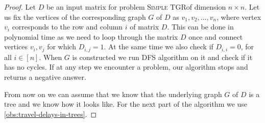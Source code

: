 \documentclass[11pt,a4paper]{article}
\theoremstyle{remark}
\theoremstyle{definition}
\newcommand{\deltaExact}{\textsc{Simple TGR}}
\begin{document}
\begin{proof}
    Let $D$ be an input matrix for problem \deltaExact of dimension $n \times n$.
    Let us fix the vertices of the corresponding graph $G$ of $D$ as $v_1, v_2, \dots, v_n$, where vertex $v_i$ corresponds to the row and column $i$ of matrix $D$.
    This can be done in polynomial time as we need to loop through the matrix $D$ once and connect vertices $v_i, v_j$ for which $D_{i,j} = 1$. At the same time we also check if $D_{i,i} = 0$, for all $i \in [n]$.
    When $G$ is constructed we run DFS algorithm on it and check if it has no cycles.
    If at any step we encounter a problem, our algorithm stops and returns a negative answer.
    
    From now on we can assume that we know that the underlying graph $G$ of $D$ is a tree and we know how it looks like.
    For the next part of the algorithm we use \cref{obs:travel-delays-in-trees}.
    

\end{proof}
\end{document}
